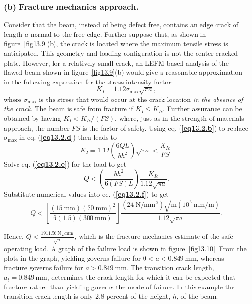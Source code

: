 \documentclass{AeroStructure-ERJohnson}
\begin{document}
\begin{example}
\subsubsection{(b) Fracture mechanics approach.} Consider that the beam, instead of being defect free, contains an edge crack of length $a$ normal to the free edge. Further suppose that, as shown in figure~\ref{fig13.9}(b), the crack is located where the maximum tensile stress is anticipated. This geometry and loading configuration is not the center-cracked plate. However, for a relatively small crack, an LEFM-based analysis of the flawed beam shown in figure~\ref{fig13.9}(b) would give a reasonable approximation in the following expression for the stress intensity factor:
\begin{equation}
K_{I}=1.12 \sigma_{\max } \sqrt{\pi a}, \label{eq13.2.d}\tag{d}
\end{equation}
where $\sigma_{\max }$ is the stress that would occur at the crack location \textit{in the absence of the crack}. The beam is safe from fracture if $K_{I} \leq K_{I c}$. Further assurance can be obtained by having $K_{I}<K_{I c} /(F S)$, where, just as in the strength of materials approach, the number \textit{FS} is the factor of safety. Using eq. (\textbf{\ref{eq13.2.b}}) to replace $\sigma_{\max }$ in eq. (\textbf{\ref{eq13.2.d}}) then leads to
\begin{equation}
K_{I}=1.12\left(\frac{6 Q L}{b h^{2}}\right) \sqrt{\pi a}<\frac{K_{I c}}{\textit{FS}}. \label{eq13.2.e}\tag{e}
\end{equation}
Solve eq. (\textbf{\ref{eq13.2.e}}) for the load to get
\begin{equation}
Q<\left(\frac{b h^{2}}{6(\textit{FS}) L}\right) \frac{K_{I c}}{1.12 \sqrt{\pi a}}. \label{eq13.2.f}\tag{f}
\end{equation}
Substitute numerical values into eq. (\textbf{\ref{eq13.2.f}}) to get
\begin{equation}
Q<\left[\frac{(15 \mathrm{~mm})(30 \mathrm{~mm})^{2}}{6(1.5)(300 \mathrm{~mm})}\right] \frac{\left(24 \mathrm{~N} / \mathrm{mm}^{2}\right) \sqrt{\mathrm{m}\left(10^{3} \mathrm{~mm} / \mathrm{m}\right)}}{1.12 \sqrt{\pi a}}. \label{eq13.2.g}\tag{g}
\end{equation}
\vspace*{2pt}
\pagebreak

\noindent Hence, $Q<\frac{1911.56 \mathrm{~N} \sqrt{\mathrm{mm}}}{\sqrt{a}}$, which is the fracture mechanics estimate of the safe operating load. A graph of the failure load is shown in figure~\ref{fig13.10}. From the plots in the graph, yielding governs failure for $0<a<0.849 \mathrm{~mm}$, whereas fracture governs failure for $a>0.849 \mathrm{~mm}$. The transition crack length, $a_{t}=0.849 \mathrm{~mm}$, determines the crack length for which it can be expected that fracture rather than yielding governs the mode of failure. In this example the transition crack length is only 2.8 percent of the height, $h$, of the beam.


\end{example}
\end{document}
